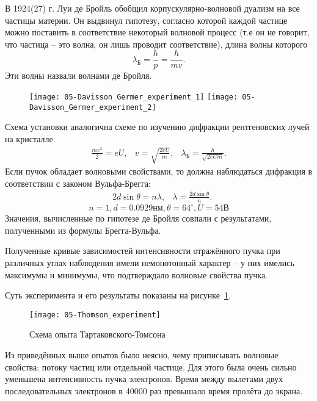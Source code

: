 
В 1924(27) г. Луи де Бройль обобщил корпускулярно-волновой дуализм на все
частицы материи. Он выдвинул гипотезу, согласно которой каждой частице можно
поставить в соответствие некоторый волновой процесс (т.е он не говорит, что
частица -- это волна, он лишь проводит соответствие), длина волны которого
\[
    \lambda_\text{Б} = \frac{h}{p} = \frac{h}{mv}.
\]
Эти волны назвали волнами де Бройля.


\begin{figure}[h!]
    \center
    \texttt{[image: 05-Davisson\_Germer\_experiment\_1]}\hfill
    \texttt{[image: 05-Davisson\_Germer\_experiment\_2]}
\end{figure}
Схема установки аналогична схеме по изучению дифракции рентгеновских лучей на
кристалле.
\begin{align*}
    \frac{mv^2}{2} = eU, & v = \sqrt{\frac{2eU}{m}},
    & \lambda_\text{Б} = \frac{h}{\sqrt{2eUm}}.
\end{align*}
Если пучок обладает волновыми свойствами, то должна наблюдаться дифракция в
соответствии с законом Вульфа-Брегга:
\begin{align*}
    & 2d\sin\theta = n\lambda,
    & \lambda = \frac{2d\sin\theta}{n}.
\end{align*}
\[
    n = 1, d = 0.0929 нм,  \theta = 64^\circ, U = 54 В
\]
Значения, вычисленные по гипотезе де Бройля совпали с результатами, полученными
из формулы Брегга-Вульфа.

Полученные кривые зависимостей интенсивности отражённого пучка при различных
углах наблюдения имели немонотонный характер -- у них имелись максимумы и
минимумы, что подтверждало волновые свойства пучка.

Суть эксперимента и его результаты показаны на рисунке~\ref{fig:05-Thomson_experiment}.
\begin{figure}[h!]
    \center
    \texttt{[image: 05-Thomson\_experiment]}
    \caption{Схема опыта Тартаковского-Томсона}
    \label{fig:05-Thomson_experiment}
\end{figure}

Из приведённых выше опытов было неясно, чему приписывать волновые свойства:
потоку частиц или отдельной частице. Для этого была очень сильно уменьшена
интенсивность пучка электронов. Время между вылетами двух последовательных
электронов в 40000 раз превышало время пролёта до экрана.

